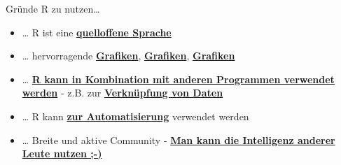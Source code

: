 \documentclass[ignorenonframetext,]{beamer}
\begin{document}
\begin{frame}{Gründe R zu nutzen\ldots{}}

\begin{itemize}
\item
  \ldots{} R ist eine
  \href{https://stackoverflow.com/questions/1546583/what-is-the-definition-of-an-open-source-programming-language}{\textbf{quelloffene
  Sprache}}
\item
  \ldots{} hervorragende
  \href{http://matthewlincoln.net/2014/12/20/adjacency-matrix-plots-with-r-and-ggplot2.html}{\textbf{Grafiken}},
  \href{https://www.r-bloggers.com/3d-plots-with-ggplot2-and-plotly\%20/}{\textbf{Grafiken}},
  \href{https://procomun.wordpress.com/2011/03/18/splomr/}{\textbf{Grafiken}}
\item
  \ldots{} \href{https://github.com/Japhilko/RInterfaces}{\textbf{R kann
  in Kombination mit anderen Programmen verwendet werden}} - z.B. zur
  \href{https://github.com/Japhilko/RInterfaces/blob/master/slides/Datenimport.md}{\textbf{Verknüpfung
  von Daten}}
\item
  \ldots{} R kann
  \href{https://cran.r-project.org/web/packages/MplusAutomation/index.html}{\textbf{zur
  Automatisierung}} verwendet werden
\item
  \ldots{} Breite und aktive Community -
  \href{https://www.r-bloggers.com/}{\textbf{Man kann die Intelligenz
  anderer Leute nutzen ;-)}}
\end{itemize}

\end{frame}
\end{document}
